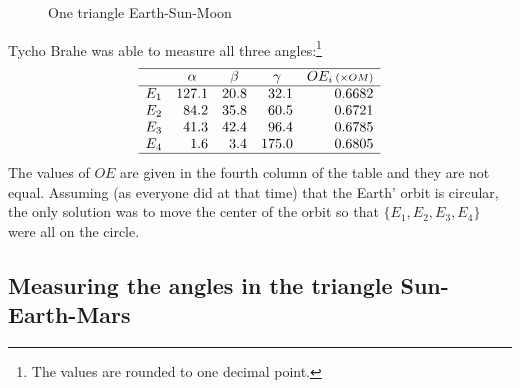 \begin{figure}[t]
\begin{center}
\caption{One triangle Earth-Sun-Moon}\label{f.kepler-one-triangle}
\end{center}
\end{figure}


Tycho Brahe was able to measure all three angles:\footnote{The values are rounded to one decimal point.}
\[
\begin{array}{rrrrr}
\hline
& \multicolumn{1}{c}{\alpha} & \multicolumn{1}{c}{\beta} &
  \multicolumn{1}{c}{\gamma} & \multicolumn{1}{c}{OE_i \,\scriptstyle(\times OM)} \\\hline
E_1 & 127.1 & 20.8  & 32.1 & 0.6682\\
E_2 & 84.2 & 35.8 & 60.5 & 0.6721\\
E_3 & 41.3 & 42.4 &96.4 & 0.6785\\
E_4 & 1.6& 3.4& 175.0 & 0.6805\\
\hline
\end{array}
\]
The values of $OE$ are given in the fourth column of the table and they are not equal. Assuming (as everyone did at that time) that the Earth' orbit is circular, the only solution was to move the center of the orbit so that $\{E_1,E_2,E_3,E_4\}$ were all on the circle.

\subsection{Measuring the angles in the triangle Sun-Earth-Mars}


